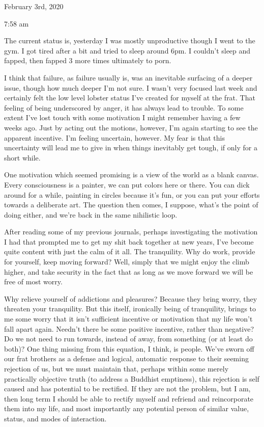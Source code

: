 \bigskip
\bigskip
February 3rd, 2020

7:58 am

The current status is, yesterday I was mostly unproductive though I went
to the gym. I got tired after a bit and tried to sleep around 6pm. I
couldn't sleep and fapped, then fapped 3 more times ultimately to porn.

I think that failure, as failure usually is, was an inevitable surfacing
of a deeper issue, though how much deeper I'm not sure. I wasn't very
focused last week and certainly felt the low level lobster status I've
created for myself at the frat. That feeling of being underscored by
anger, it has always lead to trouble. To some extent I've lost touch
with some motivation I might remember having a few weeks ago. Just by
acting out the motions, however, I'm again starting to see the apparent
incentive. I'm feeling uncertain, however. My fear is that this
uncertainty will lead me to give in when things inevitably get tough, if
only for a short while.

One motivation which seemed promising is a view of the world as a blank
canvas. Every consciousness is a painter, we can put colors here or
there. You can dick around for a while, painting in circles because it's
fun, or you can put your efforts towards a deliberate art. The question
then comes, I suppose, what's the point of doing either, and we're back
in the same nihilistic loop.

After reading some of my previous journals, perhaps investigating the
motivation I had that prompted me to get my shit back together at new
years, I've become quite content with just the calm of it all. The
tranquility. Why do work, provide for yourself, keep moving forward?
Well, simply that we might enjoy the climb higher, and take security in
the fact that as long as we move forward we will be free of most worry.

Why relieve yourself of addictions and pleasures? Because they bring
worry, they threaten your tranquility. But this itself, ironically being
of tranquility, brings to me some worry that it isn't sufficient
incentive or motivation that my life won't fall apart again. Needn't
there be some positive incentive, rather than negative? Do we not need
to run towards, instead of away, from something (or at least do both)?
One thing missing from this equation, I think, is people. We've sworn
off our frat brothers as a defense and logical, automatic response to
their seeming rejection of us, but we must maintain that, perhaps within
some merely practically objective truth (to address a Buddhist
emptiness), this rejection is self caused and has potential to be
rectified. If they are not the problem, but I am, then long term I
should be able to rectify myself and refriend and reincorporate them
into my life, and most importantly any potential person of similar
value, status, and modes of interaction.

